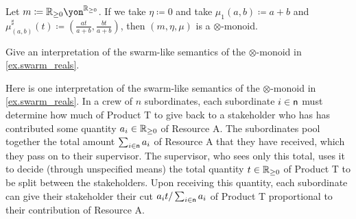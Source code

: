 \documentclass[Book-Poly]{subfiles}
\begin{document}
\begin{example}\label{ex.swarm_reals}
Let $m\coloneqq\rr_{\geq0}\yon^{\rr_{\geq0}}$. If we take $\eta\coloneqq0$ and take $\mu_1(a,b) \coloneqq a+b$ and $\mu^\sharp_{(a,b)}(t) \coloneqq \left(\frac{at}{a+b},\frac{bt}{a+b}\right)$, then $(m, \eta, \mu)$ is a $\otimes$-monoid.
\end{example}

\begin{exercise}
Give an interpretation of the swarm-like semantics of the $\otimes$-monoid in \cref{ex.swarm_reals}.
\begin{solution}
Here is one interpretation of the swarm-like semantics of the $\otimes$-monoid in \cref{ex.swarm_reals}.
In a crew of $n$ subordinates, each subordinate $i \in \mathsf{n}$ must determine how much of Product T to give back to a stakeholder who has has contributed some quantity $a_i \in \mathbb{R}_{\geq0}$ of Resource A.
The subordinates pool together the total amount $\sum_{i \in \mathsf{n}} a_i$ of Resource A that they have received, which they pass on to their supervisor.
The supervisor, who sees only this total, uses it to decide (through unspecified means) the total quantity $t \in \mathbb{R}_{\geq0}$ of Product T to be split between the stakeholders.
Upon receiving this quantity, each subordinate can give their stakeholder their cut $a_i t / \sum_{i \in \mathsf{n}} a_i$ of Product T proportional to their contribution of Resource A.


\end{solution}
\end{exercise}
\end{document}
